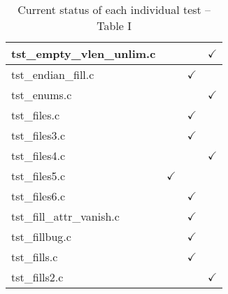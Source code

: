 \begin{table}[H]
\begin{tabular}{|l|c|c|c|}
tst\_empty\_vlen\_unlim.c   &           &               & $\checkmark$  \\ \hline
tst\_endian\_fill.c     &               & $\checkmark$  &               \\ \hline
tst\_enums.c            &               &               & $\checkmark$  \\ \hline
tst\_files.c            &               & $\checkmark$  &               \\ \hline
tst\_files3.c           &               & $\checkmark$  &               \\ \hline
tst\_files4.c           &               &               & $\checkmark$  \\ \hline
tst\_files5.c           & $\checkmark$  &               &               \\ \hline
tst\_files6.c           &               & $\checkmark$  &               \\ \hline
tst\_fill\_attr\_vanish.c   &           & $\checkmark$  &               \\ \hline
tst\_fillbug.c          &               & $\checkmark$  &               \\ \hline
tst\_fills.c            &               & $\checkmark$  &               \\ \hline
tst\_fills2.c           &               &               & $\checkmark$  \\ \hline
\hline
\end{tabular}
\caption{\label{tab:nc_test4_status_1} Current status of each individual test -- Table I}
\end{table}

